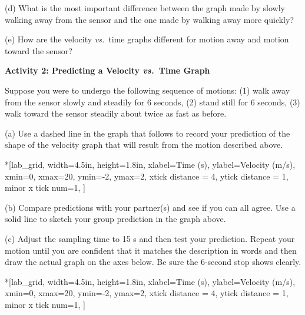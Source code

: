 (d) What is the most important difference between the graph made by slowly walking
away from the sensor and the one made by walking away more quickly? 
\answerspace{25mm}

(e) How are the velocity \textit{vs.}~time graphs different for motion away and motion
toward the sensor?
\answerspace{25mm}

\pagebreak[2]
\textbf{Activity 2: Predicting a Velocity \textit{vs.}~Time Graph }

Suppose you were to undergo the following sequence of motions: (1) walk away
from the sensor slowly and steadily for 6 seconds, (2) stand still for 6 seconds,
(3) walk toward the sensor steadily about twice as fast as before.

(a) Use a dashed line in the graph that follows to record your prediction of
the shape of the velocity graph that will result from the motion described above.

\begin{lab_axis}*[lab_grid,
	width=4.5in, height=1.8in,
	xlabel={Time (s)},
	ylabel={Velocity (m/s)},
	xmin=0, xmax=20,
	ymin=-2, ymax=2,
	xtick distance = 4,
	ytick distance = 1,
	minor x tick num=1,
	]
\end{lab_axis}

(b) Compare predictions with your partner(s) and see if you can all agree. Use
a solid line to sketch your group prediction in the graph above.

(c) Adjust the sampling time to 15 s and then test your prediction. Repeat your
motion until you are confident that it matches the description in words and
then draw the actual graph on the axes below. Be sure the 6-second stop shows
clearly.

\begin{lab_axis}*[lab_grid,
	width=4.5in, height=1.8in,
	xlabel={Time (s)},
	ylabel={Velocity (m/s)},
	xmin=0, xmax=20,
	ymin=-2, ymax=2,
	xtick distance = 4,
	ytick distance = 1,
	minor x tick num=1,
	]
\end{lab_axis}

